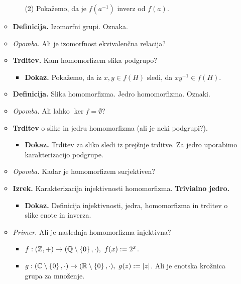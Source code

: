 \begin{enumerate}
\begin{itemize}
\begin{itemize}
            (2) Pokažemo, da je $f(a^{-1})$ inverz od $f(a)$.
        \end{itemize}
        \item \colorbox{purple!30}{\textbf{Definicija.}} Izomorfni grupi. Oznaka. 
        \item \colorbox{yellow!30}{\emph{Opomba.}} Ali je izomorfnost ekvivalenčna relacija?
        \item \colorbox{blue!30}{\textbf{Trditev.}} Kam homomorfizem slika podgrupo?
        \begin{itemize}
            \item \colorbox{green!30}{\textbf{Dokaz.}} Pokažemo, da iz $x, y \in f(H)$ sledi, da $xy^{-1} \in f(H)$.
        \end{itemize}
        \item \colorbox{purple!30}{\textbf{Definicija.}} Slika homomorfizma. Jedro homomorfizma. Oznaki.
        \item \colorbox{yellow!30}{\emph{Opomba.}} Ali lahko $\ker f = \emptyset$?
        \item \colorbox{blue!30}{\textbf{Trditev}} o slike in jedru homomorfizma (ali je neki podgrupi?).
        \begin{itemize}
            \item \colorbox{green!30}{\textbf{Dokaz.}} Trditev za sliko sledi iz prejšnje trditve. Za jedro uporabimo karakterizacijo podgrupe.
        \end{itemize}
        \item \colorbox{yellow!30}{\emph{Opomba.}} Kadar je homomorfizem surjektiven?
        \item \colorbox{blue!30}{\textbf{Izrek.}} Karakterizacija injektivnosti homomorfizma. \textbf{Trivialno jedro.}
        \begin{itemize}
            \item \colorbox{green!30}{\textbf{Dokaz.}} Definicija injektivnosti, jedra, homomorfizma in trditev o slike enote in inverza.
        \end{itemize}
        \item \colorbox{yellow!30}{\emph{Primer.}} Ali je naslednja homomorfizma injektivna?
        \begin{itemize}
            \item $f: (\mathbb{Z},+) \to (\mathbb{Q} \setminus \left\{0\right\}, \cdot), \ f(x) := 2^x$.
            \item $g: (\mathbb{C} \setminus \left\{0\right\}, \cdot) \to (\mathbb{R} \setminus \left\{0\right\}, \cdot), \ g(z) := |z|$. Ali je enotska krožnica grupa za množenje.
        \end{itemize}
    \end{itemize}


\end{enumerate}
